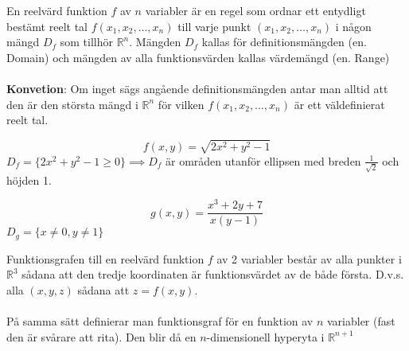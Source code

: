 \documentclass{report}
\begin{document}
{
En reelvärd funktion $ f $ av $ n $ variabler är en regel som ordnar ett entydligt bestämt reelt tal $ f(x_1, x_2, \ldots , x_n) $ till varje punkt $ (x_1, x_2, \ldots ,x_n) $ i någon mängd $ D_f  $ som tillhör $ \mathbb{R}^n $. Mängden $ D_f $ kallas för definitionsmängden (en. Domain) och mängden av alla funktionsvärden kallas värdemängd (en. Range)\\\\

\textbf{Konvetion}: Om inget sägs angående definitionsmängden antar man alltid att den är den största mängd i $ \mathbb{R}^n $ för vilken $ f(x_1, x_2, \ldots , x_n) $ är ett väldefinierat reelt tal. 
}

\ex{}
{
\begin{equation*}
f(x,y) = \sqrt{2x^2+y^2-1} 
\end{equation*}
$ D_f = \{ 2x^2+y^2-1 \ge 0 \} \implies D_f $ är områden utanför ellipsen med breden $ \frac{1}{ \sqrt{2} }  $ och höjden 1. 
}

\ex{}
{
\begin{equation*}
g(x,y) = \frac{x^3+2y+7}{x(y-1)} 
\end{equation*}
$ D_g = \{ x \ne 0, y \ne 1 \} $ 
}

{
Funktionsgrafen till en reelvärd funktion $ f $ av 2 variabler består av alla punkter i $ \mathbb{R}^3 $ sådana att den tredje koordinaten är funktionsvärdet av de både första. D.v.s. alla $ (x,y,z) $ sådana att $ z = f(x,y) $.\\\\

På samma sätt definierar man funktionsgraf för en funktion av $ n $ variabler (fast den är svårare att rita). Den blir då en $ n $-dimensionell hyperyta i $ \mathbb{R}^{n+1} $ 
}
\end{document}

